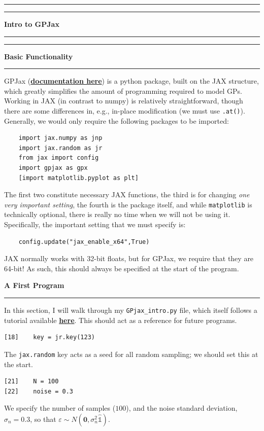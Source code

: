 \documentclass[12pt]{article}
\newcommand{\minisection}[1]{
    \par\vspace{0.25cm}
    \textbf{#1}\par
    \vspace{0.1cm}
    \hrule
    \vspace{0.25cm}
}
\newcommand{\doubleline}{
    \hrule
    \vspace*{0.05cm}
    \hrule
    \vspace*{0.25cm}
}
\newcommand{\idop}{\hat{\mathds{1}}}
\begin{document}
    \vspace*{0.5cm}
    \doubleline
    \begin{center}
        \huge \textbf{Intro to GPJax} \label{GPJax}
    \end{center}
    \doubleline
    \minisection{Basic Functionality}
    GPJax (\href{https://docs.jaxgaussianprocesses.com/}{\textbf{documentation here}}) is a python package, built on the JAX structure, which greatly simplifies the amount of programming required to model GPs. Working in JAX (in contrast to numpy) is relatively straightforward, though there are some differences in, e.g., in-place modification (we must use \verb|.at()|).\\
    Generally, we would only require the following packages to be imported:
    \begin{verbatim}    import jax.numpy as jnp
    import jax.random as jr
    from jax import config
    import gpjax as gpx
    [import matplotlib.pyplot as plt]\end{verbatim}
    The first two constitute necessary JAX functions, the third is for changing \textit{one very important setting}, the fourth is the package itself, and while \verb|matplotlib| is technically optional, there is really no time when we will not be using it.\\
    Specifically, the important setting that we must specify is:
    \begin{verbatim}    config.update("jax_enable_x64",True)\end{verbatim}
    JAX normally works with 32-bit floats, but for GPJax, we require that they are 64-bit! As such, this should always be specified at the start of the program.
    \minisection{A First Program}
    In this section, I will walk through my \verb|GPjax_intro.py| file, which itself follows a tutorial available \href{https://docs.jaxgaussianprocesses.com/_examples/regression/}{\textbf{here}}. This should act as a reference for future programs.
    \begin{verbatim}[18]    key = jr.key(123)\end{verbatim}
    \begin{bestbox}
        The \verb|jax.random| key acts as a seed for all random sampling; we should set this at the start.
    \end{bestbox}
    \begin{verbatim}[21]    N = 100
[22]    noise = 0.3\end{verbatim}
    \begin{bestbox}
        We specify the number of samples ($100$), and the noise standard deviation, $\sigma_n=0.3$, so that $\varepsilon\sim N(\bm 0, \sigma_n^2\idop)$.    
    \end{bestbox}
\end{document}
